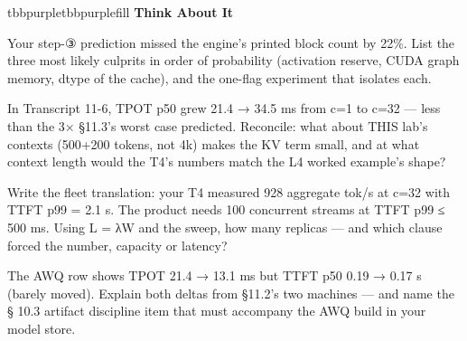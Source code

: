 \begin{calloutbox}{tbbpurple}{tbbpurplefill}
{\normalsize\bfseries\color{tbbpurple}Think About It}\par\vspace{3pt}
\begin{tbbitemize}
  \item Your step-③ prediction missed the engine's printed block count by 22\%. List the three most likely culprits in order of probability (activation reserve, CUDA graph memory, dtype of the cache), and the one-flag experiment that isolates each.
  \item In Transcript 11-6, TPOT p50 grew 21.4 → 34.5 ms from c=1 to c=32 — less than the 3× §11.3's worst case predicted. Reconcile: what about THIS lab's contexts (500+200 tokens, not 4k) makes the KV term small, and at what context length would the T4's numbers match the L4 worked example's shape?
  \item Write the fleet translation: your T4 measured 928 aggregate tok/s at c=32 with TTFT p99 = 2.1 s. The product needs 100 concurrent streams at TTFT p99 ≤ 500 ms. Using L = λW and the sweep, how many replicas — and which clause forced the number, capacity or latency?
  \item The AWQ row shows TPOT 21.4 → 13.1 ms but TTFT p50 0.19 → 0.17 s (barely moved). Explain both deltas from §11.2's two machines — and name the § 10.3 artifact discipline item that must accompany the AWQ build in your model store.
\end{tbbitemize}
\end{calloutbox}





